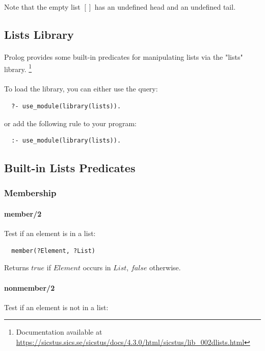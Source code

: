 \documentclass{article}
\begin{document}
\begin{multicols}{2}
  \noindent Note that the empty list $[]$ has an undefined head and an undefined tail.  
  
  \subsection{Lists Library}
  
  \paragraph{} Prolog provides some built-in predicates for manipulating lists via the "lists" library. \footnote{Documentation available at \url{https://sicstus.sics.se/sicstus/docs/4.3.0/html/sicstus/lib_002dlists.html}}
  
  \paragraph{} To load the library, you can either use the query:
  
  \begin{lstlisting}
  ?- use_module(library(lists)).
  \end{lstlisting}
  
  or add the following rule to your program:

  \begin{lstlisting}
  :- use_module(library(lists)).
  \end{lstlisting}
  
  \subsection{Built-in Lists Predicates}
  
  \subsubsection{Membership}
  
  \paragraph{member/2} Test if an element is in a list:
  
  \begin{lstlisting}
  member(?Element, ?List)
  \end{lstlisting} 
  
  Returns $true$ if $Element$ occurs in $List$, $false$ otherwise.

  \paragraph{nonmember/2} Test if an element is not in a list:
  

\end{multicols}
\end{document}
